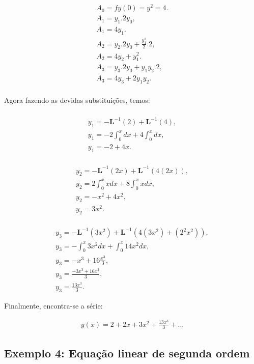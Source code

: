 \begin{gather*}
A_{0} = fy(0) = y^2 = 4.\nonumber\\
A_{1} = y_{1}.2y_{0},\nonumber\\
A_{1} = 4y_{1}.\nonumber\\
A_{2} = y_{2}.2y_{0} + \frac {y_{1}^{2}}{2}.2, \nonumber\\
A_{2} = 4y_{2} + y_{1}^2.\nonumber\\
A_{3} = y_{3}.2y_{0}+y_{1}y_{2}.2,\nonumber\\
A_{3} = 4y_{3} + 2y_{1}y_{2}.\nonumber\\
\end{gather*}

Agora fazendo as devidas substituições, temos:

\begin{gather*}\nonumber\\
y_{1} = -\textbf{L}^{-1} (2) + \textbf{L}^{-1}(4),\nonumber\\
  y_{1} = -2\int_0^{x}dx + 4\int_0^{x}dx , \nonumber\\
  y_{1} = -2 + 4x.
\end{gather*}

\begin{gather*}\nonumber\\
y_{2} = -\textbf{L}^{-1} (2x) + \textbf{L}^{-1}(4(2x)),\nonumber\\
  y_{2} = 2\int_0^{x}xdx + 8\int_0^{x}xdx , \nonumber\\
  y_{2} = -x^2 + 4x^2,\nonumber\\
  y_{2} = 3x^2.\nonumber\\
\end{gather*}


\begin{gather*}
y_{3} = -\textbf{L}^{-1} (3x^2) + \textbf{L}^{-1}(4(3x^2) + (2^2x^2)),\\
  y_{3} = -\int_0^{x}3x^2dx + \int_0^{x}14x^2dx,  \\
  y_{3} = -x^3 + 16\frac{x^{3}}{3},\\
  y_{3} = \frac{-3x^{3} + 16x^3}{3},\\
   y_{3} = \frac{13x^{3}}{3}.
\end{gather*}

Finalmente, encontra-se a série:

\begin{gather*}
  y(x) = 2 + 2x + 3x^2 + \frac{13x^{3}}{3} + ... 
\end{gather*}


\subsection{Exemplo 4: Equação linear de segunda ordem}

